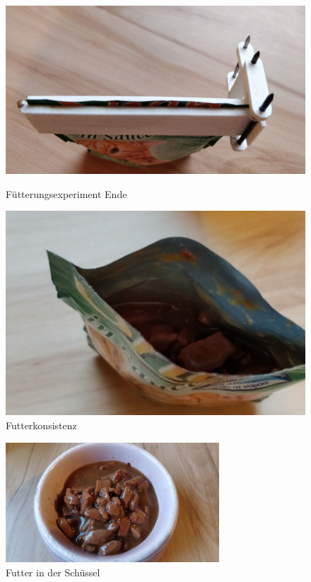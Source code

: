 \begin{figure}[H]
   \begin{minipage}[hbt]{.4\linewidth} %
      \includegraphics[width=\linewidth]{Bilder/Futterungsexperiment_Ende/Futter_Ende}
      \caption{Fütterungsexperiment Ende}
      \label{Fütterungsexperiment_Ende} 
   \end{minipage}
   \hspace{.2\linewidth}%
   \begin{minipage}[hbt]{.4\linewidth} %
      \includegraphics[width=\linewidth]{Bilder/Futterungsexperiment_Ende/Futter_Ende_1}
      \caption{Futterkonsistenz}
      \label{Futter_Ende_1}
   \end{minipage}
\end{figure}

\begin{figure}[H]
\begin{center}
\includegraphics[width=8cm]{Bilder/Futterungsexperiment_Ende/Futter_Ende_2}
\caption{Futter in der Schüssel}
\label{Ansicht_von_der_Futterschüssel} 
\end{center}
\end{figure}


